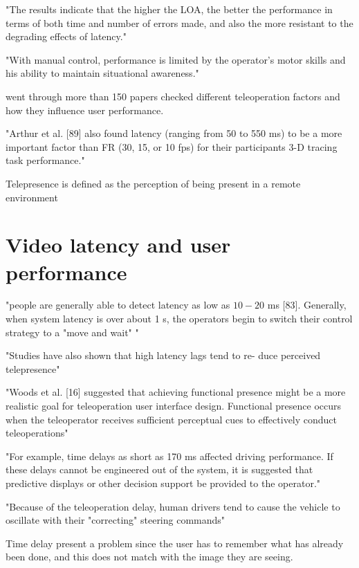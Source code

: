 \citep{Luck2006} "The results indicate that the higher the LOA, the better the performance in terms of both time and number of errors made, and also the more resistant to the degrading effects of latency."

\citep{Fong2001} "With manual control, performance is limited by the operator's motor skills and his ability to maintain situational awareness."

\citep{Chen2007} went through more than 150 papers checked different teleoperation factors and how they influence user performance.

"Arthur et al. [89] also found latency (ranging from 50 to 550 ms) to be a more important factor than FR (30, 15, or 10 fps) for their participants 3-D tracing task performance."

Telepresence is defined as the perception of being present in a remote environment 

\section{Video latency and user performance}


\citep{Chen2007}

"people are generally able to detect latency as low as $10-20$ ms [83]. Generally, when system latency is over about 1 s, the operators begin to switch their control strategy to a "move and wait" "

"Studies have also shown that high latency lags tend to re-
duce perceived telepresence"

"Woods et al. [16] suggested that achieving functional presence might be a more realistic goal for teleoperation user interface design. Functional presence occurs when the teleoperator receives sufficient perceptual cues to effectively conduct teleoperations"

"For example, time delays as short as 170 ms affected driving performance. If these delays cannot be engineered out of the system, it is suggested that predictive displays or other decision support be provided to the operator."

\citep{Appelqvist2007} "Because of the teleoperation delay, human drivers
tend to cause the vehicle to oscillate with their "correcting" steering commands" 

Time delay present a problem since the user has to remember what has already been done, and this does not match with the image they are seeing.

